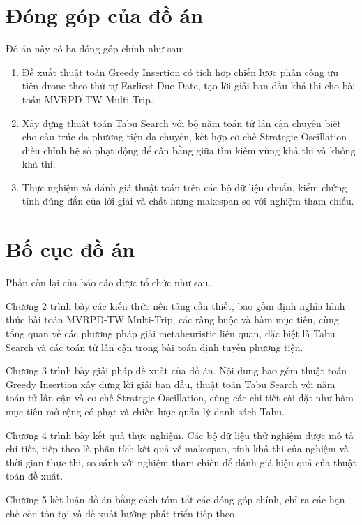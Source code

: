 \documentclass[../DoAn.tex]{subfiles}
\begin{document}
\section{Đóng góp của đồ án}

Đồ án này có ba đóng góp chính như sau:

\begin{enumerate}
    \item Đề xuất thuật toán Greedy Insertion có tích hợp chiến lược phân công ưu tiên drone theo thứ tự Earliest Due Date, tạo lời giải ban đầu khả thi cho bài toán MVRPD-TW Multi-Trip.

    \item Xây dựng thuật toán Tabu Search với bộ năm toán tử lân cận chuyên biệt cho cấu trúc đa phương tiện đa chuyến, kết hợp cơ chế Strategic Oscillation điều chỉnh hệ số phạt động để cân bằng giữa tìm kiếm vùng khả thi và không khả thi.

    \item Thực nghiệm và đánh giá thuật toán trên các bộ dữ liệu chuẩn, kiểm chứng tính đúng đắn của lời giải và chất lượng makespan so với nghiệm tham chiếu.
\end{enumerate}

\section{Bố cục đồ án}

Phần còn lại của báo cáo được tổ chức như sau.

Chương 2 trình bày các kiến thức nền tảng cần thiết, bao gồm định nghĩa hình thức bài toán MVRPD-TW Multi-Trip, các ràng buộc và hàm mục tiêu, cùng tổng quan về các phương pháp giải metaheuristic liên quan, đặc biệt là Tabu Search và các toán tử lân cận trong bài toán định tuyến phương tiện.

Chương 3 trình bày giải pháp đề xuất của đồ án. Nội dung bao gồm thuật toán Greedy Insertion xây dựng lời giải ban đầu, thuật toán Tabu Search với năm toán tử lân cận và cơ chế Strategic Oscillation, cùng các chi tiết cài đặt như hàm mục tiêu mở rộng có phạt và chiến lược quản lý danh sách Tabu.

Chương 4 trình bày kết quả thực nghiệm. Các bộ dữ liệu thử nghiệm được mô tả chi tiết, tiếp theo là phân tích kết quả về makespan, tính khả thi của nghiệm và thời gian thực thi, so sánh với nghiệm tham chiếu để đánh giá hiệu quả của thuật toán đề xuất.

Chương 5 kết luận đồ án bằng cách tóm tắt các đóng góp chính, chỉ ra các hạn chế còn tồn tại và đề xuất hướng phát triển tiếp theo.
\end{document}
